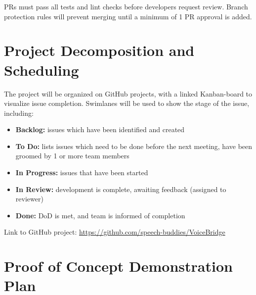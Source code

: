 \documentclass{article}
\begin{document}
PRs must pass all tests and lint checks before developers request review. Branch protection rules will prevent merging until a minimum of 1 PR approval is added.

\section{Project Decomposition and Scheduling}
\begin{comment}
\begin{itemize}
  \item How will you be using GitHub projects?
  \item Include a link to your GitHub project
\end{itemize}

\wss{How will the project be scheduled?  This is the big picture schedule, not
details. You will need to reproduce information that is in the course outline
for deadlines.}
\end{comment}

The project will be organized on GitHub projects, with a linked Kanban-board to visualize issue completion. Swimlanes will be used to show the stage of the issue, including:

\begin{itemize}
    \item \textbf{Backlog:} issues which have been identified and created
    \item \textbf{To Do:} lists issues which need to be done before the next meeting, have been groomed by 1 or more team members
    \item \textbf{In Progress:} issues that have been started
    \item \textbf{In Review:} development is complete, awaiting feedback (assigned to reviewer)
    \item \textbf{Done:} DoD is met, and team is informed of completion
\end{itemize}

Link to GitHub project: \url{https://github.com/speech-buddies/VoiceBridge}

\section{Proof of Concept Demonstration Plan}

\end{document}
